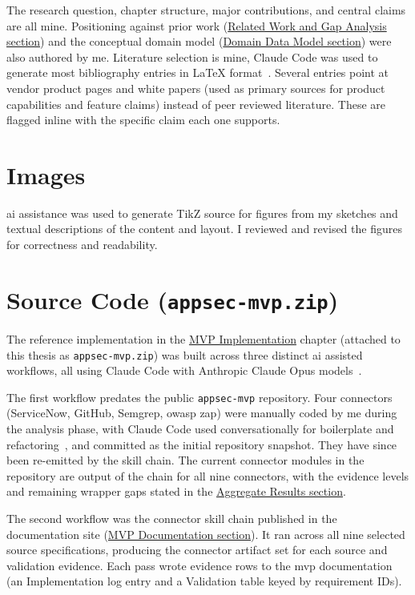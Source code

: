 The research question, chapter structure, major contributions, and central claims are all mine. Positioning against prior work (\hyperref[sec:related-work]{Related Work and Gap Analysis section}) and the conceptual domain model (\hyperref[sec:data-entities]{Domain Data Model section}) were also authored by me. Literature selection is mine, Claude Code was used to generate most bibliography entries in \LaTeX{} format~\parencite{Anthropic2026ClaudeCode}. Several entries point at vendor product pages and white papers (used as primary sources for product capabilities and feature claims) instead of peer reviewed literature. These are flagged inline with the specific claim each one supports.

\section{Images}
\label{sec:genai-images}

\Gls{ai} assistance was used to generate TikZ source for figures from my sketches and textual descriptions of the content and layout. I reviewed and revised the figures for correctness and readability.

\section{Source Code (\texttt{appsec-mvp.zip})}
\label{sec:genai-source-code}

The reference implementation in the \hyperref[ch:implementation]{MVP Implementation} chapter (attached to this thesis as \texttt{appsec-mvp.zip}) was built across three distinct \gls{ai} assisted workflows, all using Claude Code with Anthropic Claude Opus models~\parencite{Anthropic2026ClaudeCode, Anthropic2025ClaudeOpus45, Anthropic2026ClaudeOpus46, Anthropic2026ClaudeOpus47}.

The first workflow predates the public \texttt{appsec-mvp} repository. Four connectors (ServiceNow, GitHub, Semgrep, \gls{owasp} \gls{zap}) were manually coded by me during the analysis phase, with Claude Code used conversationally for boilerplate and refactoring~\parencite{Anthropic2026ClaudeCode}, and committed as the initial repository snapshot. They have since been re-emitted by the skill chain. The current connector modules in the repository are output of the chain for all nine connectors, with the evidence levels and remaining wrapper gaps stated in the \hyperref[sec:impl-results]{Aggregate Results section}.

The second workflow was the connector skill chain published in the documentation site (\hyperref[sec:genai-mvp-docs]{MVP Documentation section}). It ran across all nine selected source specifications, producing the connector artifact set for each source and validation evidence. Each pass wrote evidence rows to the \gls{mvp} documentation (an Implementation log entry and a Validation table keyed by requirement IDs).

